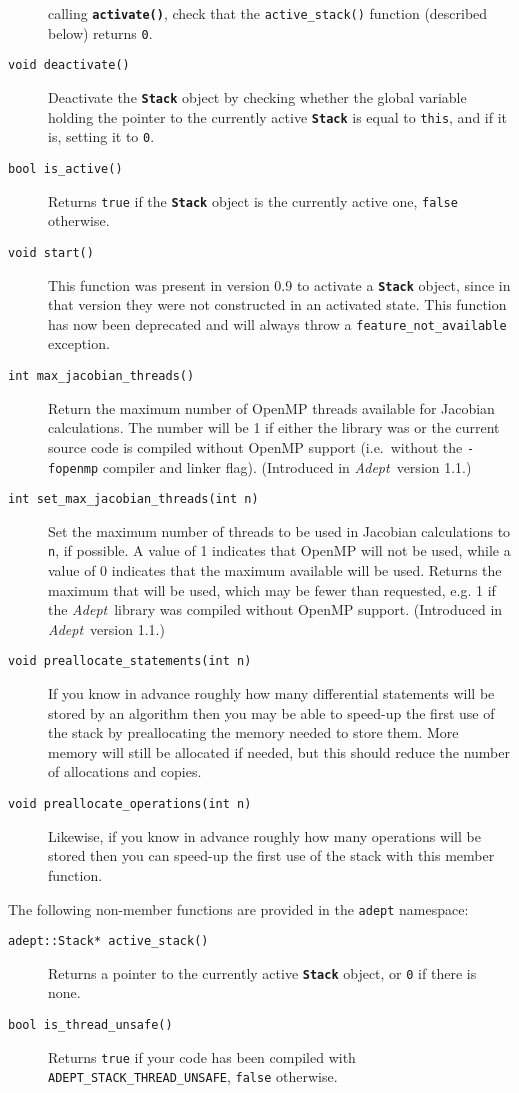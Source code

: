 \documentclass[a4,oneside]{book}
\def\codesize{\small}
\def\Adept{\emph{Adept}}
\def\code#1{{\codesize\texttt{#1}}}
\def\codebf#1{{\codesize\texttt{\textbf{#1}}}}
\def\citem#1{\item[{\codesize\texttt{#1}}]}
\begin{document}
\begin{description}
calling \codebf{activate()}, check that the \code{active\_stack()}
function (described below) returns \code{0}.
%
\citem{void deactivate()} Deactivate the \codebf{Stack} object by
checking whether the global variable holding the pointer to the
currently active \codebf{Stack} is equal to \code{this}, and if it is,
setting it to \code{0}.
%
\citem{bool is\_active()} Returns \code{true} if the \codebf{Stack}
object is the currently active one, \code{false} otherwise.
%
\citem{void start()} This function was present in version 0.9 to
activate a \codebf{Stack} object, since in that version they were not
constructed in an activated state.  This function has now been
deprecated and will always throw a \code{feature\_not\_available}
exception.
\citem{int max\_jacobian\_threads()} Return the maximum number of
OpenMP threads available for Jacobian calculations.  The number will
be 1 if either the library was or the current source code is compiled
without OpenMP support (i.e.\ without the \code{-fopenmp} compiler and
linker flag). (Introduced in \Adept\ version 1.1.) 
\citem{int set\_max\_jacobian\_threads(int n)} Set the maximum number of
threads to be used in Jacobian calculations to \code{n}, if
possible. A value of 1 indicates that OpenMP will not be used, while a
value of 0 indicates that the maximum available will be used. Returns
the maximum that will be used, which may be fewer than requested,
e.g. 1 if the \Adept\ library was compiled without OpenMP
support. (Introduced in \Adept\ version 1.1.) 
\citem{void preallocate\_statements(int n)} If you know in advance
roughly how many differential statements will be stored by an
algorithm then you may be able to speed-up the first use of the stack
by preallocating the memory needed to store them.  More memory will
still be allocated if needed, but this should reduce the number of
allocations and copies.
\citem{void preallocate\_operations(int n)} Likewise, if you know in
advance roughly how many operations will be stored then you can
speed-up the first use of the stack with this member function.
\end{description}

\noindent The following non-member functions are provided in the
\code{adept} namespace:
\begin{description}
\citem{adept::Stack* active\_stack()} Returns a pointer to the
currently active \codebf{Stack} object, or \code{0} if there is none.
\citem{bool is\_thread\_unsafe()} Returns \code{true} if your code has
been compiled with \code{ADEPT\_STACK\_THREAD\_UNSAFE}, \code{false}
otherwise.
%
\end{description}
\end{document}
